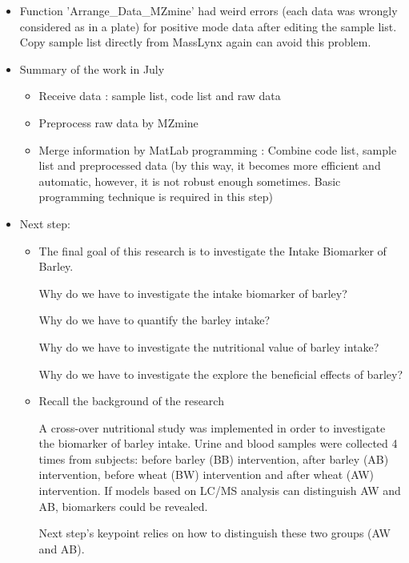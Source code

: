 \begin{itemize}
    \item Function 'Arrange\_Data\_MZmine' had weird errors (each data was wrongly considered as in a plate) for positive mode data after editing the sample list. Copy sample list directly from MassLynx again can avoid this problem.
   
    \item Summary of the work in July
    
    \begin{itemize}
        \item Receive data : sample list, code list and raw data
        \item Preprocess raw data by MZmine
        \item Merge information by MatLab programming : Combine code list, sample list and preprocessed data (by this way, it becomes more efficient and automatic, however, it is not robust enough sometimes. Basic programming technique is required in this step)
    \end{itemize}
    
    \item Next step:
    
    \begin{itemize}
        \item The final goal of this research is to investigate the Intake Biomarker of Barley.
        
        Why do we have to investigate the intake biomarker of barley?
        
        Why do we have to quantify the barley intake?
        
        Why do we have to investigate the nutritional value of barley intake?
        
        Why do we have to investigate the explore the beneficial effects of barley?
        
        \item Recall the background of the research
        
        A cross-over nutritional study was implemented in order to investigate the biomarker of barley intake. Urine and blood samples were collected 4 times from subjects: before barley (BB) intervention, after barley (AB) intervention, before wheat (BW) intervention and after wheat (AW) intervention. If models based on LC/MS analysis can distinguish AW and AB, biomarkers could be revealed.  
        
        Next step's keypoint relies on how to distinguish these two groups (AW and AB).
        

\end{itemize}
\end{itemize}
